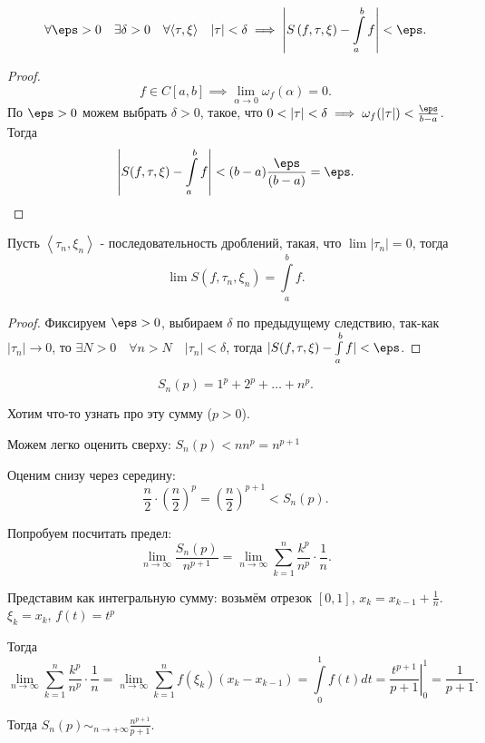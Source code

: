 \begin{consequence} 
    \[ \forall{\eps > 0}\quad \exists{\delta > 0}\quad \forall{\left<\tau, \xi\right>}\quad |\tau| < \delta \implies \left|S\left( f, \tau, \xi \right) - \int\limits_{a}^{b} f\right| < \eps   .\] 
    \begin{proof}
        \[ f\in C\left[a, b\right] \implies \lim\limits_{\alpha \to  0} \omega_{f}(\alpha) = 0 .\]
        По $\eps > 0$ можем выбрать $\delta > 0$, такое, что $0 < |\tau| < \delta \implies \omega_{f}(|\tau|) < \frac{\eps}{b-a}$.
        Тогда
        \[ \left|S(f, \tau, \xi) - \int\limits_{a}^{b} f\right| < (b-a) \frac{\eps}{(b-a)} = \eps  .\qedhere\] 
    \end{proof}
\end{consequence}
\begin{consequence} 
    Пусть $\left<\tau_n, \xi_n\right>$ - последовательность дроблений, такая, что $\lim |\tau_n| = 0$, тогда
    \[ \lim S\left( f, \tau_n, \xi_n \right) = \int\limits_{a}^{b} f   .\] 
    \begin{proof}
        Фиксируем $\eps > 0$, выбираем $\delta$ по предыдущему следствию, так-как $|\tau_n| \to 0$, то $\exists{N > 0}\quad \forall{n > N}\quad |\tau_n| < \delta$, тогда $|S(f, \tau, \xi) - \int\limits_{a}^{b} f| < \eps $. 
    \end{proof}
\end{consequence}
\begin{example} 
    \[ S_{n}(p) = 1^{p}+2^{p}+\ldots+n^{p} .\]

    Хотим что-то узнать про эту сумму ($p > 0$).
    
    Можем легко оценить сверху: $S_{n}(p) < n n^{p} = n^{p+1}$

    Оценим снизу через середину:
    \[ \frac{n}{2} \cdot \left( \frac{n}{2} \right)^{p} = \left( \frac{n}{2} \right)^{p+1} < S_{n}(p)   .\]

    Попробуем посчитать предел:
    \[ \lim\limits_{n \to \infty} \frac{S_{n}(p)}{n^{p+1}} = \lim\limits_{n \to \infty} \sum\limits_{k=1}^{n} \frac{k^{p}}{n^{p}} \cdot \frac{1}{n} .\]

    Представим как интегральную сумму: возьмём отрезок $\left[0, 1\right]$, $x_{k} = x_{k-1} + \frac{1}{n}$. $\xi_k = x_{k}$, $f(t) = t^{p}$

    Тогда
    \[ \lim\limits_{n \to \infty} \sum\limits_{k=1}^{n} \frac{k^{p}}{n^{p}} \cdot \frac{1}{n} = \lim\limits_{n \to \infty} \sum\limits_{k=1}^{n} f(\xi_{k})(x_{k}-x_{k-1}) = \int\limits_{0}^{1} f(t)dt = \left. \frac{t ^{p+1}}{p+1}\right|_{0}^{1} = \frac{1}{p+1}  .\] 
    
    Тогда $S_{n}(p) \sim_{n\to +\infty} \frac{n^{p+1}}{p+1}$. 
\end{example}
